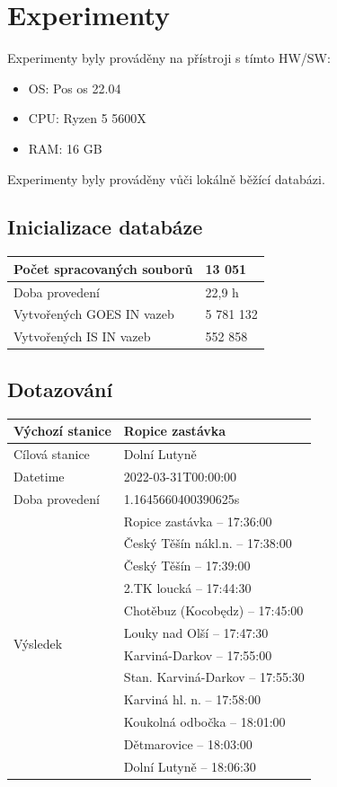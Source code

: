 \documentclass[10pt,xcolor=pdflatex,dvipsnames,table,oneside]{book}
\begin{document}
\chapter{Experimenty}
Experimenty byly prováděny na přístroji s tímto HW/SW:
\begin{itemize}
    \item OS: Pos os 22.04
    \item CPU: Ryzen 5 5600X
    \item RAM: 16 GB
\end{itemize}
Experimenty byly prováděny vůči lokálně běžící databázi.

\section{Inicializace databáze}

\vspace{1em}
\begin{tabular}{|l|l|}
    \hline
    Počet spracovaných souborů & 13 051 \\
    \hline
    Doba provedení &  22,9 h \\
    \hline
    Vytvořených GOES IN vazeb & 5 781 132 \\
    \hline
    Vytvořených IS IN vazeb & 552 858 \\
    \hline
\end{tabular}

\section{Dotazování}

\vspace{1em}
\begin{tabular}{|l|l|}
    \hline
    Výchozí stanice & Ropice zastávka \\
    \hline
    Cílová stanice & Dolní Lutyně \\
    \hline
    Datetime & 2022-03-31T00:00:00 \\
    \hline
    Doba provedení & 1.1645660400390625s \\
    \hline
    \multirow{12}{*}{Výsledek} & Ropice zastávka -- 17:36:00 \\
     & Český Těšín nákl.n. -- 17:38:00 \\
     & Český Těšín -- 17:39:00 \\
     & 2.TK loucká -- 17:44:30 \\
     & Chotěbuz (Kocobędz) -- 17:45:00 \\
     & Louky nad Olší -- 17:47:30 \\
     & Karviná-Darkov -- 17:55:00 \\
     & Stan. Karviná-Darkov -- 17:55:30 \\
     & Karviná hl. n. -- 17:58:00 \\
     & Koukolná odbočka -- 18:01:00 \\
     & Dětmarovice -- 18:03:00 \\
     & Dolní Lutyně -- 18:06:30 \\
    \hline
\end{tabular}
\end{document}
